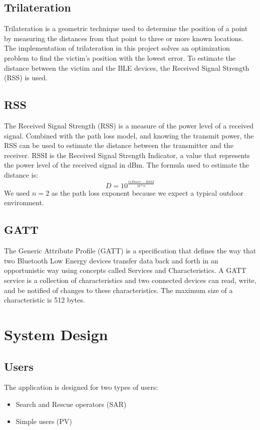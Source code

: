\documentclass{article}
\begin{document}
\begin{multicols}{2}
\subsection{Trilateration}
Trilateration is a geometric technique 
used to determine the position of a point 
by measuring the distances from that point 
to three or more known locations.
The implementation of trilateration in this
project solves an optimization problem to find
the victim's position with the lowest error.
To estimate the distance between the victim and
the BLE devices, the Received Signal Strength
(RSS) is used.
\subsection{RSS}
The Received Signal Strength (RSS) is a measure
of the power level of a received signal. 
Combined with the path loss model, and knowing the
transmit power, the RSS can be used to estimate
the distance between the transmitter and the 
receiver.
RSSI is the Received Signal Strength Indicator,
a value that represents the power level of the
received signal in dBm.
The formula used to estimate the distance is:
\begin{equation}
    D=10^{\frac{txPower - RSSI}{10 * n}}
\end{equation}
We used $n=2$ as the path loss exponent because
we expect a typical outdoor environment.
\subsection{GATT}
The Generic Attribute Profile (GATT) is a 
specification that defines the way that two
Bluetooth Low Energy devices transfer data back
and forth in an opportunistic way
using concepts called Services and Characteristics.
A GATT service is a collection of characteristics
and two connected devices can read, write, and
be notified of changes to these characteristics.
The maximum size of a characteristic is 512 bytes.
\section{System Design}
\subsection{Users}
The application is designed for two types of users:
\begin{itemize}
    \item Search and Rescue operators (SAR)
    \item Simple users (PV)
\end{itemize}

\end{multicols}
\end{document}
